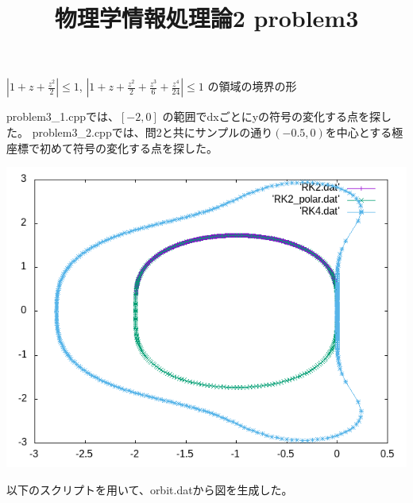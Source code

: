 \documentclass[12pt,a5]{bxjsarticle}
\title{物理学情報処理論2 problem3}
\date{}
\begin{document}
\maketitle

$ | 1 + z + \frac{z^2}{2} | \le 1 $, $ | 1 + z + \frac{z^2}{2} + \frac{z^3}{6} + \frac{z^4}{24} | \le 1 $ の領域の境界の形

problem3\_1.cppでは、$ [-2, 0] $ の範囲でdxごとにyの符号の変化する点を探した。
problem3\_2.cppでは、問2と共にサンプルの通り$ (-0.5, 0) $を中心とする極座標で初めて符号の変化する点を探した。

\includegraphics[width=\linewidth]{orbit.png}

以下のスクリプトを用いて、orbit.datから図を生成した。

\end{document}
